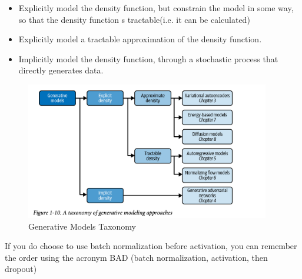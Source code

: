 \begin{itemize}
	\item Explicitly model the density function, but constrain the model in some way, so that the density function s tractable(i.e. it can be calculated)
	\item Explicitly model a tractable approximation of the density function.
	\item Implicitly model the density function, through a stochastic process that directly generates data.
\end{itemize}



\begin{figure}
	\begin{center}
		\includegraphics[width=0.95\textwidth]{figures/generative_model_taxonomy}
	\end{center}
	\caption{Generative Models Taxonomy}\label{fig:gmodel_taxonomy}
\end{figure}




If you do choose to use batch normalization before activation, you can remember the order using the acronym BAD (batch normalization, activation, then dropout)
